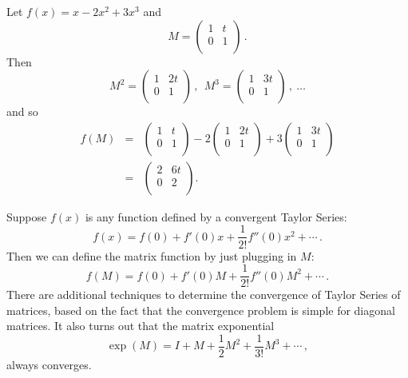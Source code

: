 \begin{example}
Let $f(x) = x - 2x^2 + 3x^3$
and \[M=\begin{pmatrix}
1 & t \\
0 & 1 \\
\end{pmatrix}\, .\]  
Then 
\[
M^2 = \begin{pmatrix}
1 & 2t \\
0 & 1 \\
\end{pmatrix}\, ,\:\:
M^3 = \begin{pmatrix}
1 & 3t \\
0 & 1 \\
\end{pmatrix}\, ,\: \ldots
\]
and so 
\begin{eqnarray*}
f(M) &=& \begin{pmatrix}
	1 & t \\
	0 & 1 \\
	\end{pmatrix} 
- 2 \begin{pmatrix}
	1 & 2t \\
	0 & 1 \\
	\end{pmatrix} 
+ 3 \begin{pmatrix}
	1 & 3t \\
	0 & 1 \\
	\end{pmatrix} \\
&=& \begin{pmatrix}
	2 & 6t \\
	0 & 2 \\
	\end{pmatrix}.
\end{eqnarray*}
\end{example}

Suppose $f(x)$ is any function defined by a convergent Taylor Series:
\[
f(x) = f(0) + f'(0)x + \frac{1}{2!}f''(0)x^2 + \cdots\, .
\]
Then we can define the matrix function by just plugging in $M$:
\[
f(M) = f(0) + f'(0)M + \frac{1}{2!}f''(0)M^2 + \cdots\, .
\]
There are additional techniques to determine the convergence of Taylor Series of matrices, based on the fact that the convergence problem is simple for diagonal matrices.  It also turns out that the matrix exponential
\[\exp (M) = I + M + \frac{1}{2}M^2 + \frac{1}{3!}M^3 + \cdots\, ,\] always converges.



